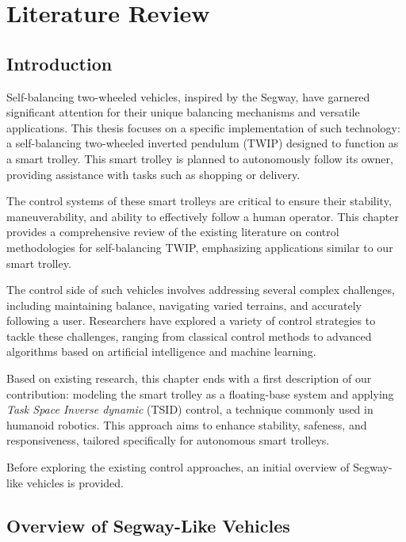 \chapter{Literature Review}
\label{ch:chapter_two}%


\section{Introduction}
\label{sec:Introduction}

Self-balancing two-wheeled vehicles, inspired by the Segway, have garnered significant attention for their unique balancing mechanisms and versatile applications. This thesis focuses on a specific implementation of such technology: a self-balancing two-wheeled inverted pendulum (TWIP) designed to function as a smart trolley. This smart trolley is planned to autonomously follow its owner, providing assistance with tasks such as shopping or delivery.

The control systems of these smart trolleys are critical to ensure their stability, maneuverability, and ability to effectively follow a human operator. This chapter provides a comprehensive review of the existing literature on control methodologies for self-balancing TWIP, emphasizing applications similar to our smart trolley.

The control side of such vehicles involves addressing several complex challenges, including maintaining balance, navigating varied terrains, and accurately following a user. Researchers have explored a variety of control strategies to tackle these challenges, ranging from classical control methods to advanced algorithms based on artificial intelligence and machine learning.

Based on existing research, this chapter ends with a first description of our contribution: modeling the smart trolley as a floating-base system and applying \textit{Task Space Inverse dynamic} (TSID) control, a technique commonly used in humanoid robotics.
This approach aims to enhance stability, safeness, and responsiveness, tailored specifically for autonomous smart trolleys.

Before exploring the existing control approaches, an initial overview of Segway-like vehicles is provided.

\section{Overview of Segway-Like Vehicles}
\label{sec:Overview of Segway-Like Vehicles}


